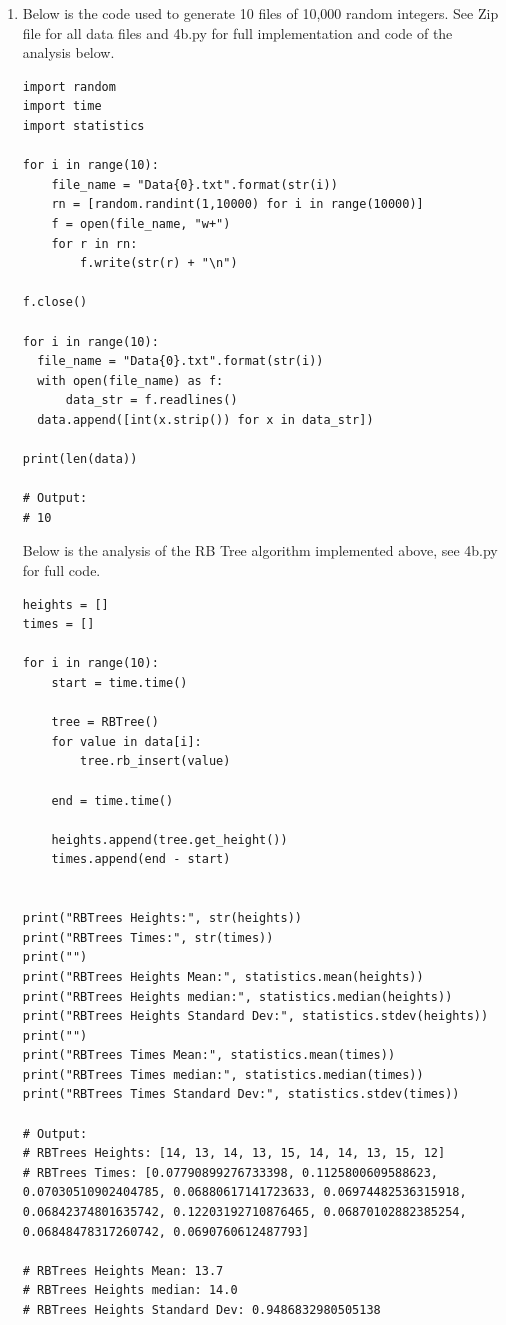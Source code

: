 \documentclass{article}
\begin{document}
\begin{enumerate}
\begin{enumerate}
      \item Below is the code used to generate 10 files of 10,000 random integers. See Zip file for all data files and 4b.py for full implementation and code of the analysis below.
      
      \begin{lstlisting}
import random
import time
import statistics

for i in range(10):
    file_name = "Data{0}.txt".format(str(i))
    rn = [random.randint(1,10000) for i in range(10000)]
    f = open(file_name, "w+")
    for r in rn: 
        f.write(str(r) + "\n")

f.close()

for i in range(10):
  file_name = "Data{0}.txt".format(str(i))
  with open(file_name) as f:
      data_str = f.readlines()
  data.append([int(x.strip()) for x in data_str])

print(len(data))

# Output:
# 10
      \end{lstlisting}

      Below is the analysis of the RB Tree algorithm implemented above, see 4b.py for full code. 

      \begin{lstlisting}
heights = []
times = []

for i in range(10):
    start = time.time()
    
    tree = RBTree()
    for value in data[i]:
        tree.rb_insert(value)
    
    end = time.time()
    
    heights.append(tree.get_height())
    times.append(end - start)

    
print("RBTrees Heights:", str(heights))
print("RBTrees Times:", str(times))
print("")
print("RBTrees Heights Mean:", statistics.mean(heights))
print("RBTrees Heights median:", statistics.median(heights))
print("RBTrees Heights Standard Dev:", statistics.stdev(heights))
print("")
print("RBTrees Times Mean:", statistics.mean(times))
print("RBTrees Times median:", statistics.median(times))
print("RBTrees Times Standard Dev:", statistics.stdev(times))

# Output:
# RBTrees Heights: [14, 13, 14, 13, 15, 14, 14, 13, 15, 12]
# RBTrees Times: [0.07790899276733398, 0.1125800609588623, 0.07030510902404785, 0.06880617141723633, 0.06974482536315918, 0.06842374801635742, 0.12203192710876465, 0.06870102882385254, 0.06848478317260742, 0.0690760612487793]

# RBTrees Heights Mean: 13.7
# RBTrees Heights median: 14.0
# RBTrees Heights Standard Dev: 0.9486832980505138


\end{lstlisting}
\end{enumerate}
\end{enumerate}
\end{document}
